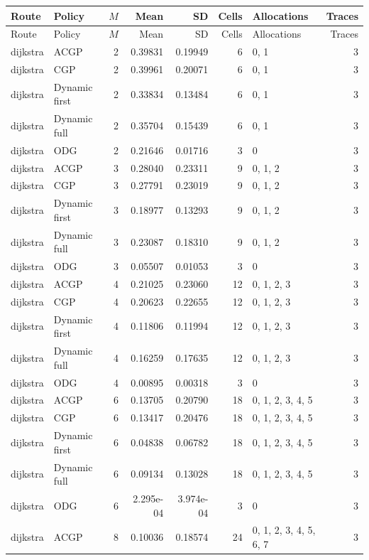 \documentclass[10pt,a4paper]{article}
\begin{document}
\tiny\setlength{\tabcolsep}{2pt}\begin{longtable}{@{}p{23mm}p{29mm}rrrrp{36mm}r@{}}
\toprule Route & Policy & $M$ & Mean & SD & Cells & Allocations & Traces \\ \midrule\endfirsthead
\toprule Route & Policy & $M$ & Mean & SD & Cells & Allocations & Traces \\ \midrule\endhead
\bottomrule\endfoot
dijkstra & ACGP & 2 & 0.39831 & 0.19949 & 6 & 0, 1 & 3 \\
dijkstra & CGP & 2 & 0.39961 & 0.20071 & 6 & 0, 1 & 3 \\
dijkstra & Dynamic first & 2 & 0.33834 & 0.13484 & 6 & 0, 1 & 3 \\
dijkstra & Dynamic full & 2 & 0.35704 & 0.15439 & 6 & 0, 1 & 3 \\
dijkstra & ODG & 2 & 0.21646 & 0.01716 & 3 & 0 & 3 \\
dijkstra & ACGP & 3 & 0.28040 & 0.23311 & 9 & 0, 1, 2 & 3 \\
dijkstra & CGP & 3 & 0.27791 & 0.23019 & 9 & 0, 1, 2 & 3 \\
dijkstra & Dynamic first & 3 & 0.18977 & 0.13293 & 9 & 0, 1, 2 & 3 \\
dijkstra & Dynamic full & 3 & 0.23087 & 0.18310 & 9 & 0, 1, 2 & 3 \\
dijkstra & ODG & 3 & 0.05507 & 0.01053 & 3 & 0 & 3 \\
dijkstra & ACGP & 4 & 0.21025 & 0.23060 & 12 & 0, 1, 2, 3 & 3 \\
dijkstra & CGP & 4 & 0.20623 & 0.22655 & 12 & 0, 1, 2, 3 & 3 \\
dijkstra & Dynamic first & 4 & 0.11806 & 0.11994 & 12 & 0, 1, 2, 3 & 3 \\
dijkstra & Dynamic full & 4 & 0.16259 & 0.17635 & 12 & 0, 1, 2, 3 & 3 \\
dijkstra & ODG & 4 & 0.00895 & 0.00318 & 3 & 0 & 3 \\
dijkstra & ACGP & 6 & 0.13705 & 0.20790 & 18 & 0, 1, 2, 3, 4, 5 & 3 \\
dijkstra & CGP & 6 & 0.13417 & 0.20476 & 18 & 0, 1, 2, 3, 4, 5 & 3 \\
dijkstra & Dynamic first & 6 & 0.04838 & 0.06782 & 18 & 0, 1, 2, 3, 4, 5 & 3 \\
dijkstra & Dynamic full & 6 & 0.09134 & 0.13028 & 18 & 0, 1, 2, 3, 4, 5 & 3 \\
dijkstra & ODG & 6 & 2.295e-04 & 3.974e-04 & 3 & 0 & 3 \\
dijkstra & ACGP & 8 & 0.10036 & 0.18574 & 24 & 0, 1, 2, 3, 4, 5, 6, 7 & 3 \\

\end{longtable}
\end{document}
